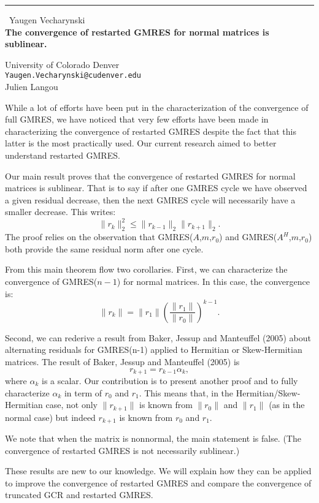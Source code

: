 \documentclass{report}
\begin{document}
\begin{center}
\rule{6in}{1pt} \
{\large Yaugen Vecharynski \\
{\bf The convergence of restarted GMRES for normal matrices is sublinear.}}

University of Colorado Denver
\\
{\tt Yaugen.Vecharynski@cudenver.edu}\\
Julien Langou\end{center}

While a lot of efforts have been put in the characterization of the
convergence of full GMRES, we have noticed that very few efforts have
been made in characterizing the convergence of restarted GMRES despite
the fact that this latter is the most practically used. Our current
research aimed to better understand restarted GMRES.

Our main result proves that the convergence of restarted GMRES for normal
matrices is sublinear. That is to say if after one GMRES cycle we have
observed a given residual decrease, then the next GMRES cycle will
necessarily have a smaller decrease. This writes:
$$ \| r_k \|_2^2 \leq \| r_{k-1} \|_2 \|r_{k+1} \|_2. $$
The proof relies on the observation that GMRES($A$,$m$,$r_0$) and
GMRES($A^H$,$m$,$r_0$) both provide the same residual norm after one
cycle.

From this main theorem flow two corollaries. First, we can characterize
the convergence of GMRES($n-1$) for normal matrices. In this case, the
convergence is:
$$ \| r_k \| = \| r_1 \| \left( \frac{ \|r_1\| } { \| r_0 \| } \right)^{k-1} .$$

Second, we can rederive a result from Baker, Jessup and Manteuffel (2005)
about alternating residuals for GMRES(n-1) applied to Hermitian or
Skew-Hermitian matrices. The result of Baker, Jessup and Manteuffel
(2005) is
$$ r_{k+1} = r_{k-1} \alpha_k,$$
where $\alpha_k$ is a scalar.
Our contribution is to present another proof and to fully characterize
$\alpha_k$ in term of $r_0$ and $r_1$. This means that, in the
Hermitian/Skew-Hermitian case, not only $ \| r_{k+1} \|$ is known from
$\|r_0\|$ and $\|r_1\|$ (as in the normal case) but indeed $ r_{k+1} $ is
known from $r_0$ and $r_1$.

We note that when the matrix is nonnormal, the main statement is false.
(The convergence of restarted GMRES is not necessarily sublinear.)

These results are new to our knowledge. We will explain how they can be
applied to improve the convergence of restarted GMRES and compare the
convergence of truncated GCR and restarted GMRES.
\end{document}

